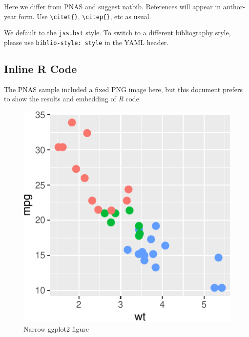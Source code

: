 \documentclass[letterpaper,9pt,twocolumn,twoside,]{pinp}
\begin{document}
Here we differ from PNAS and suggest natbib. References will appear in
author-year form. Use \texttt{\textbackslash{}citet\{\}},
\texttt{\textbackslash{}citep\{\}}, etc as usual.

We default to the \texttt{jss.bst} style. To switch to a different
bibliography style, please use \texttt{biblio-style:\ style} in the YAML
header.

\hypertarget{inline-r-code}{%
\subsection{Inline R Code}\label{inline-r-code}}

The PNAS sample included a fixed PNG image here, but this document
prefers to show the results and embedding of \emph{R} code.

\begin{Shaded}
\begin{Highlighting}[]
\OperatorTok{+}
\StringTok{    }\NormalTok{(}\NormalTok{, }\NormalTok{(}\OperatorTok{+}
\StringTok{    }\NormalTok{(}\NormalTok{)}
\end{Highlighting}
\end{Shaded}

\begin{figure}

{\centering \includegraphics{introR_files/figure-latex/figex-1} 

}

\caption{Narrow ggplot2 figure}\label{fig:figex}
\end{figure}
\end{document}
